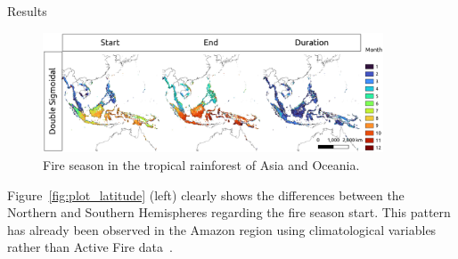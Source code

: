 \documentclass[20pt]{beamer}
\begin{document}
\begin{frame}[fragile,t]
\begin{columns}[t]
\begin{column}{0.33\linewidth}
\begin{block}{Results\vphantom{g}}
\begin{figure}[ht]
\centering
\includegraphics[width=0.9\textwidth]{figures/dsig_tropical_asia.png}
\caption{Fire season in the tropical rainforest of Asia and Oceania.}
\label{fig:dsig_tropical_asia}
\end{figure}

    \vspace{0.5cm}

Figure~\ref{fig:plot_latitude} (left) clearly shows the differences between the Northern and Southern Hemispheres regarding the fire season start.
This pattern has already been observed in the Amazon region using climatological variables rather than Active Fire data~\cite{carvalho2021a}.

    \vspace{0.5cm}


\end{block}
\end{column}
\end{columns}
\end{frame}
\end{document}
